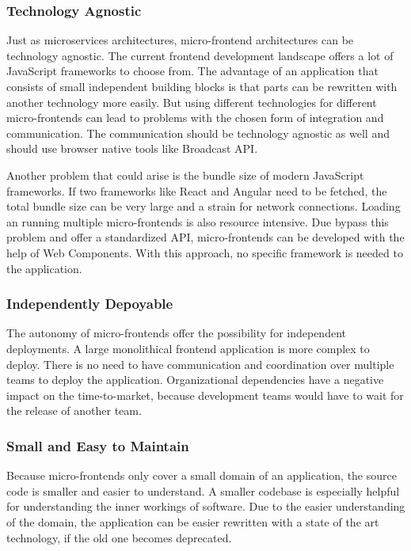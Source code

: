 \subsubsection{Technology Agnostic}

Just as microservices architectures, micro-frontend architectures can be technology agnostic. The current frontend development landscape offers a lot of JavaScript frameworks to choose from. The advantage of an application that consists of small independent building blocks is that parts can be rewritten with another technology more easily. \cite{book:2020:geers:background:micro-frontends:micro-frontends-in-action} But using different technologies for different micro-frontends can lead to problems with the chosen form of integration and communication. The communication should be technology agnostic as well and should use browser native tools like Broadcast API.

Another problem that could arise is the bundle size of modern JavaScript frameworks. If two frameworks like React and Angular need to be fetched, the total bundle size can be very large and a strain for network connections. Loading an running multiple micro-frontends is also resource intensive. Due bypass this problem and offer a standardized API, micro-frontends can be developed with the help of Web Components. With this approach, no specific framework is needed to the application. \cite{book:2020:geers:background:micro-frontends:micro-frontends-in-action} 

\subsubsection{Independently Depoyable}

The autonomy of micro-frontends offer the possibility for independent deployments. A large monolithical frontend application is more complex to deploy. There is no need to have communication and coordination over multiple teams to deploy the application. Organizational dependencies have a negative impact on the time-to-market, because development teams would have to wait for the release of another team. \cite{book:2020:geers:background:micro-frontends:micro-frontends-in-action} 

\subsubsection{Small and Easy to Maintain}

Because micro-frontends only cover a small domain of an application, the source code is smaller and easier to understand. A smaller codebase is especially helpful for understanding the inner workings of software. 
Due to the easier understanding of the domain, the application can be easier rewritten with a state of the art technology, if the old one becomes deprecated. \cite{book:2020:geers:background:micro-frontends:micro-frontends-in-action}

